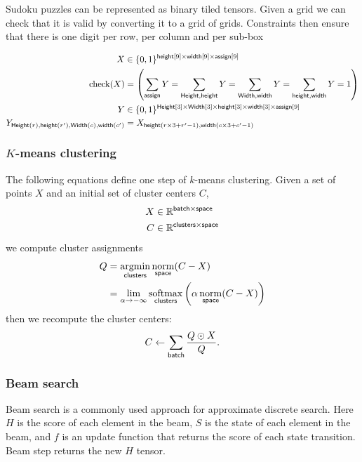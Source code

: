 \documentclass{article}
\newcommand{\reals}{\mathbb{R}}
\begin{document}
Sudoku puzzles can be represented as  binary tiled tensors.
Given a grid we can check that it is valid by converting it to a grid of grids. 
Constraints then ensure that there is one digit per row, per column and per sub-box

\begin{align*} 
X &\in \{0, 1\}^{\nset{height}{9} \times \nset{width}{9} \times \nset{assign}{9}}  \\
\text{check}(X) &=
\left(\nsum{assign} Y = 
\nsum{Height, height} Y = 
\nsum{Width, width} Y =  
\nsum{height, width} Y = 1 \right) \\
Y &\in \{0, 1\}^{\nset{Height}{3} \times \nset{Width}{3} \times \nset{height}{3} \times \nset{width}{3} \times \nset{assign}{9}}  \\
Y_{\nidx{Height}{r}, \nidx{height}{r'}, \nidx{Width}{c}, \nidx{width}{c'}} &= X_{\nidx{height}{r\times 3 + r'-1}, \nidx{width}{c\times3 + c'-1}}
\end{align*} 

\subsubsection{$K$-means clustering}

The following equations define one step of $k$-means clustering. Given a set of points $X$ and an initial set of cluster centers $C$,
\begin{align*}
  X &\in \reals^{\name{batch} \times \name{space}} \\
C &\in \reals^{\name{clusters} \times \name{space}}
\end{align*}
we compute cluster assignments
\begin{align*}
Q &= \nfun{clusters}{argmin} \nfun{space}{norm}(C-X) \\
  &= \lim_{\alpha \rightarrow -\infty} \nfun{clusters}{softmax} \left(\alpha \nfun{space}{norm}(C-X)\right)
\end{align*}
then we recompute the cluster centers:
\begin{equation*}
C \leftarrow \nsum{batch} \frac{Q \odot X}{Q}.
\end{equation*}

\subsubsection{Beam search}

Beam search is a commonly used approach for approximate discrete search. Here $H$ is the score of each element in the beam, $S$ is the state of each element in the beam, and $f$ is an update function that returns the score of each state transition. 
Beam step returns the new $H$ tensor. 
\end{document}

